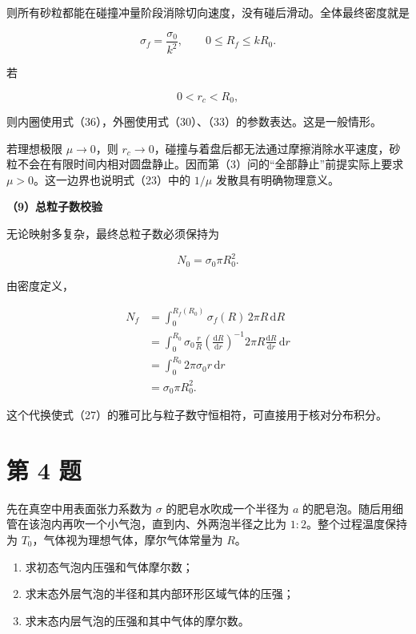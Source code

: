 \documentclass[12pt,a4paper,UTF8]{ctexart}
\newcommand{\tightlist}{\setlength{\itemsep}{0pt}\setlength{\parskip}{0pt}}
\begin{document}
则所有砂粒都能在碰撞冲量阶段消除切向速度，没有碰后滑动。全体最终密度就是

\[
\boxed{
\sigma_f=\frac{\sigma_0}{k^2},
\qquad
0\leq R_f\leq kR_0
}.
\tag{36}
\]

若

\[
0<r_c<R_0,
\]

则内圈使用式（36），外圈使用式（30）、（33）的参数表达。这是一般情形。

若理想极限 \(\mu\to0\)，则
\(r_c\to0\)，碰撞与着盘后都无法通过摩擦消除水平速度，砂粒不会在有限时间内相对圆盘静止。因而第（3）问的``全部静止''前提实际上要求
\(\mu>0\)。这一边界也说明式（23）中的 \(1/\mu\) 发散具有明确物理意义。

\begingroup
\samepage

\textbf{（9）总粒子数校验}

无论映射多复杂，最终总粒子数必须保持为

\[
N_0=\sigma_0\pi R_0^2.
\tag{37}
\]

由密度定义，

\[
\begin{aligned}
N_f
&=\int_0^{R_f(R_0)}
\sigma_f(R)\,2\pi R\,\mathrm dR\\
&=\int_0^{R_0}
\sigma_0\frac rR
\left(\frac{\mathrm dR}{\mathrm dr}\right)^{-1}
2\pi R\frac{\mathrm dR}{\mathrm dr}\,\mathrm dr\\
&=\int_0^{R_0}2\pi\sigma_0r\,\mathrm dr\\
&=\sigma_0\pi R_0^2.
\end{aligned}
\tag{38}
\]

这个代换使式（27）的雅可比与粒子数守恒相符，可直接用于核对分布积分。

\endgroup

\newpage

\section{第 4 题}\label{ux7b2c-4-ux9898}

先在真空中用表面张力系数为 \(\sigma\) 的肥皂水吹成一个半径为 \(a\)
的肥皂泡。随后用细管在该泡内再吹一个小气泡，直到内、外两泡半径之比为
\(1:2\)。整个过程温度保持为 \(T_0\)，气体视为理想气体，摩尔气体常量为
\(R\)。

\begin{enumerate}
\def\labelenumi{\arabic{enumi}.}
\tightlist
\item
  求初态气泡内压强和气体摩尔数；
\item
  求末态外层气泡的半径和其内部环形区域气体的压强；
\item
  求末态内层气泡的压强和其中气体的摩尔数。
\end{enumerate}
\end{document}
